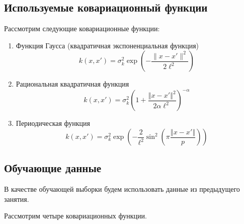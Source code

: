 \documentclass[11pt,a4paper]{article}
\providecommand{\tightlist}{%
      \setlength{\itemsep}{0pt}\setlength{\parskip}{0pt}}
\begin{document}
    \hypertarget{ux438ux441ux43fux43eux43bux44cux437ux443ux435ux43cux44bux435-ux43aux43eux432ux430ux440ux438ux430ux446ux438ux43eux43dux43dux44bux439-ux444ux443ux43dux43aux446ux438ux438}{%
\subsection{Используемые ковариационный
функции}\label{ux438ux441ux43fux43eux43bux44cux437ux443ux435ux43cux44bux435-ux43aux43eux432ux430ux440ux438ux430ux446ux438ux43eux43dux43dux44bux439-ux444ux443ux43dux43aux446ux438ux438}}

Рассмотрим следующие ковариационные функции:

\begin{enumerate}
\def\labelenumi{\arabic{enumi}.}
\tightlist
\item
  Функция Гаусса (квадратичная экспоненциальная функция)
\[
    k(x, x') = \sigma_k^2 \exp \left( -\frac{\lVert x - x' \rVert^2}{2\ell^2}  \right)
\]
\item
  Рациональная квадратичная функция
\[
    k(x, x') = \sigma_k^2 \left( 1 + \frac{ \left\Vert x - x' \right\Vert^2}{2 \alpha \ell^2} \right)^{-\alpha}
\]
\item
  Периодическая функция
\[
    k(x, x') = \sigma_k^2 \exp \left(-\frac{2}{\ell^2}\sin^2 \left( \pi \frac{\left\Vert x - x' \right\Vert}{p}\right) \right)
\]
\end{enumerate}

    \begin{center}
    \end{center}

    \hypertarget{ux43eux431ux443ux447ux430ux44eux449ux438ux435-ux434ux430ux43dux43dux44bux435}{%
\subsection{Обучающие
данные}\label{ux43eux431ux443ux447ux430ux44eux449ux438ux435-ux434ux430ux43dux43dux44bux435}}

В качестве обучающей выборки будем использовать данные из предыдущего
занятия.

Рассмотрим четыре ковариационных функции.
\end{document}
